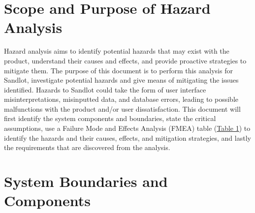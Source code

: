 \documentclass{article}
\begin{document}
\section{Scope and Purpose of Hazard Analysis}

Hazard analysis aims to identify potential hazards that may exist with the product, 
understand their causes and effects, and provide proactive strategies to mitigate
them.
The purpose of this document is to perform this analysis for Sandlot, investigate potential
hazards and give means of mitigating the issues identified. 
Hazards to Sandlot could take the form of user interface misinterpretations, misinputted data,
and database errors, leading to possible malfunctions with the product and/or user 
dissatisfaction.
This document will first identify the system components and boundaries, state the critical
assumptions, use a Failure Mode and Effects Analysis (FMEA) table (\hyperref[tab:FMEA]{Table 1}) to identify the hazards
and their causes, effects, and mitigation strategies, and lastly the requirements that
are discovered from the analysis.

\section{System Boundaries and Components}
\end{document}
